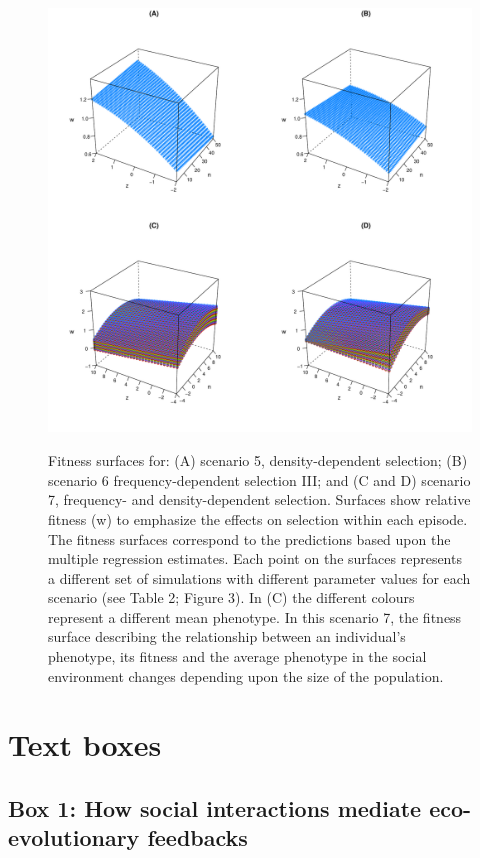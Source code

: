 \documentclass{article}
\begin{document}
\begin{figure} [H]
	\label{fig:sim3}
\end{figure}
\newpage
\begin{figure}  [H]
	\centering
	\includegraphics[width=12cm, height=12cm]{Figures/Fig5.pdf}
	\caption{Fitness surfaces for: (A) scenario 5, density-dependent selection; (B) scenario 6 frequency-dependent selection III; and (C and D) scenario 7, frequency- and density-dependent selection. Surfaces show relative fitness (w) to emphasize the effects on selection within each episode. The fitness surfaces correspond to the predictions based upon the multiple regression estimates. Each point on the surfaces represents a different set of simulations with different parameter values for each scenario (see Table 2; Figure 3). In (C) the different colours represent a different mean phenotype. In this scenario 7, the fitness surface describing the relationship between an individual's phenotype, its fitness and the average phenotype in the social environment changes depending upon the size of the population.} 
	\label{fig:surface}
\end{figure}


\newpage

\section{Text boxes}

\subsection{Box 1: How social interactions mediate eco-evolutionary feedbacks}
\end{document}
